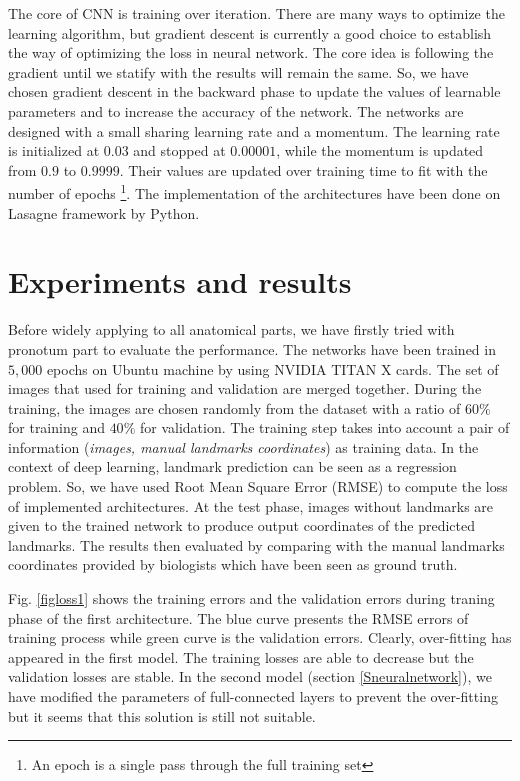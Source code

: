 \documentclass[review]{elsarticle}
\begin{document}
The core of CNN is training over iteration. There are many ways to optimize the learning algorithm, but gradient descent \cite{lecun2012efficient} is currently a good choice to establish the way of optimizing the loss in neural network. The core idea is following the gradient until we statify with the results will remain the same. So, we have chosen gradient descent in the backward phase to update the values of learnable parameters and to increase the accuracy of the network. The networks are designed with a small sharing learning rate and a momentum. The learning rate is initialized at $0.03$ and stopped at $0.00001$, while the momentum is updated from $0.9$ to $0.9999$. Their values are updated over training time to fit with the number of epochs \footnote{An epoch is a single pass through the full training set}. The implementation of the architectures have been done on Lasagne framework \cite{lasagne} by Python. 

\section{Experiments and results}
\label{sexperiments}
Before widely applying to all anatomical parts, we have firstly tried with pronotum part to evaluate the performance. The networks have been trained in $5, 000$ epochs on Ubuntu machine by using NVIDIA TITAN X cards. The set of images that used for training and validation are merged together. During the training, the images are chosen randomly from the dataset with a ratio of $60\%$ for training and $40\%$ for validation. The training step takes into account a pair of information (\textit{images, manual landmarks coordinates})  as training data. In the context of deep learning, landmark prediction can be seen as a regression problem. So, we have used Root Mean Square Error (RMSE) to compute the loss of implemented architectures. At the test phase, images without landmarks are given to the trained network to produce output coordinates of the predicted landmarks. The results then evaluated by comparing with the manual landmarks coordinates provided by biologists which have been seen as ground truth. 

Fig. \ref{figloss1} shows the training errors and the validation errors during traning phase of the first architecture. The blue curve presents the RMSE errors of training process while green curve is the validation errors. Clearly, over-fitting has appeared in the first model. The training losses are able to decrease but the validation losses are stable. In the second model (section \ref{Sneuralnetwork}), we have modified the parameters of full-connected layers to prevent the over-fitting but it seems that this solution is still not suitable.
\end{document}
